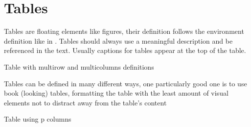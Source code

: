 

\section{Tables}
\label{sec:tables}

Tables are floating elements like figures, their definition follows the environment definition like in 
.
Tables should always use a meaningful description and be referenced in the text. Usually captions for tables appear at the top of the table. 

\begin{table}
  \centering
  \caption{Table with multirow and multicolumns definitions}
  
  \label{tab:multi}
\end{table}

Tables can be defined in many different ways, one particularly good one is to use book (looking) tables, formatting the table with the least amount of visual elements not to distract away from the table's content

\begin{table}
  \centering
  \caption{Table using p columns}
  
  \label{tab:p-table}
\end{table}

\endinput